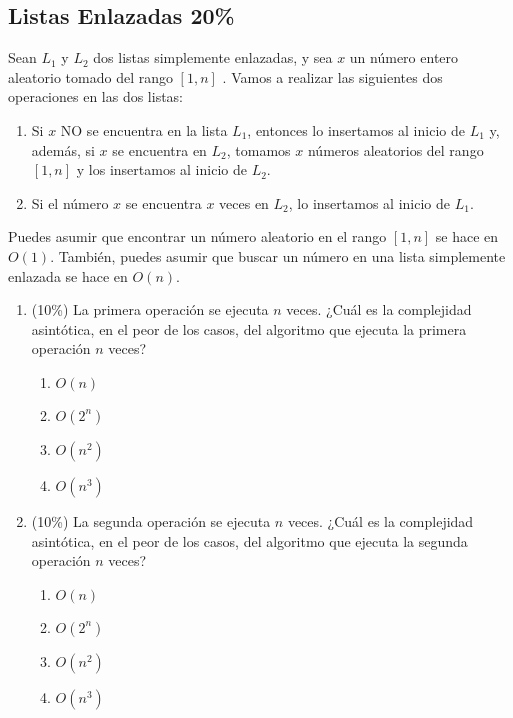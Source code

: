 \documentclass[10 pt]{article}
\begin{document}
\begin{multicols}{2}
\section{Listas Enlazadas 20\%}
Sean $L_1$ y $L_2$ dos listas simplemente enlazadas, y sea $x$ un número entero aleatorio tomado del rango $[1, n]$ . Vamos a realizar las siguientes dos operaciones en las dos listas:
\begin{enumerate}
	\item 	Si $x$ NO se encuentra en la lista $L_1$, entonces lo insertamos al inicio de $L_1$ y, además, si $x$ se encuentra en $L_2$, tomamos $x$ números aleatorios del rango $[1, n]$ y los insertamos al inicio de $L_2$.
	\item 	Si el número $x$ se encuentra $x$ veces en  $L_2$, lo insertamos al inicio de $L_1$.
\end{enumerate}
Puedes asumir que encontrar un número aleatorio en el rango $[1, n]$ se hace en $O(1)$. También, puedes asumir que buscar un número en una lista simplemente enlazada se hace en $O(n)$.
\begin{enumerate}[label=(\alph*)]
\item (10\%) La primera operación se ejecuta $n$ veces. ¿Cuál es la complejidad asintótica, en el peor de los casos, del algoritmo que ejecuta la primera operación $n$ veces?
\begin{enumerate}[label=(\roman*)]
\item $O(n)$
\item $O(2^n)$
\item $O(n^2)$
\item $O(n^3)$
\end{enumerate}
\item (10\%) La segunda operación se ejecuta $n$ veces. ¿Cuál es la complejidad asintótica, en el peor de los casos, del algoritmo que ejecuta la segunda operación $n$ veces? 
\begin{enumerate}[label=(\roman*)]
	\item $O(n)$
	\item $O(2^n)$
	\item $O(n^2)$
	\item $O(n^3)$
\end{enumerate}

\end{enumerate}
\end{multicols}
\end{document}
